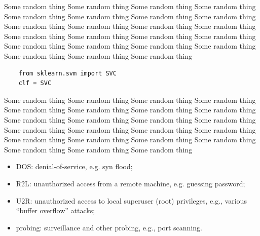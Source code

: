 Some random thing Some random thing Some random thing Some random thing Some random thing Some random thing Some random thing Some random thing Some random thing Some random thing Some random thing Some random thing Some random thing Some random thing Some random thing Some random thing Some random thing Some random thing Some random thing Some random thing Some random thing Some random thing Some random thing  
\begin{verbatim}
	from sklearn.svm import SVC
	clf = SVC
\end{verbatim}
Some random thing Some random thing Some random thing Some random thing Some random thing Some random thing Some random thing Some random thing Some random thing Some random thing Some random thing Some random thing Some random thing Some random thing Some random thing Some random thing Some random thing Some random thing Some random thing Some random thing Some random thing Some random thing Some random thing    
\begin{itemize}
	\item DOS: denial-of-service, e.g. syn flood;  
	\item R2L: unauthorized access from a remote machine, e.g. guessing password;  
	\item U2R:  unauthorized access to local superuser (root) privileges, e.g., various ``buffer overflow'' attacks;  
	\item probing: surveillance and other probing, e.g., port scanning.
\end{itemize}

 
 
  
